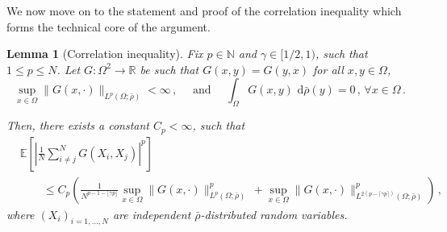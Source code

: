 \documentclass[a4paper,10pt,twoside]{amsart}
\newcommand{\dx}[1]{\,\mathrm{d}#1}  %
\newtheorem{lemma}[theorem]{Lemma}
\theoremstyle{remark}
\theoremstyle{definition}
\numberwithin{equation}{section}
\newcommand{\N}{\mathbb{N}}
\newcommand{\R}{\mathbb{R}}
\newcommand{\0}{{\bf 0}}
\newcommand{\+}{\hspace{-.5ex}+\hspace{-.5ex}}
\begin{document}
We now move on to the statement and proof of the correlation inequality which forms the technical core of the argument.
\begin{lemma}[Correlation inequality]\label{lem:corineq}
Fix $p \in \N$ and $\gamma \in [1/2,1)$, such that $1\le p\le N$. Let $G:\Omega^2 \to \R$ be such that $G(x,y)=G(y,x)$ for all $x,y \in \Omega$,
\begin{equation}
  \sup_{x\in \Omega}\lVert G(x,\cdot) \rVert_{L^p(\Omega;\bar\rho)} <\infty\,, \quad \textrm{ and }\quad \int_{\Omega}G(x,y) \, \dx{\bar\rho}(y)=0\,,\, \forall x \in \Omega\, .
\end{equation}

Then, there exists a constant $C_p<\infty$, such that
\begin{align}
&\mathbb{{E}}\left[\left|\frac{1}{N}\sum_{i\neq j}^{N}G(X_{i},X_{j})\right|^{p}\right]\\&\qquad \leq C_p\left(\frac{1}{N^{p-1-\lfloor \gamma p \rfloor}} \sup_{x \in \Omega} \lVert  G(x,\cdot)\rVert_{L^p(\Omega;\bar\rho)}^{p}\, +  \sup_{x \in \Omega} \lVert  G(x,\cdot)\rVert_{L^{2(p-\lceil \gamma p \rceil)}(\Omega;\bar\rho)}^{p} \right)\, ,
\label{eq:corineq}
\end{align}
where $(X_i)_{i=1,\dots,N}$ are independent $\bar\rho$-distributed random variables.
\end{lemma}
\end{document}
